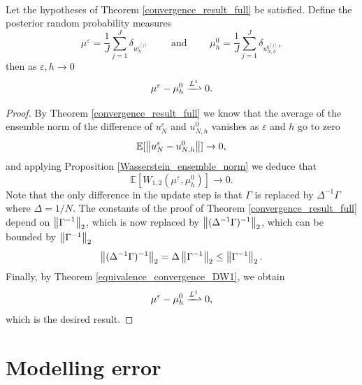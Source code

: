 \documentclass[10pt]{article}
\begin{document}
\begin{theorem}
\label{convergence_posterior_distributions}
\leavevmode \\
Let the hypotheses of Theorem \ref{convergence_result_full} be satisfied. Define the posterior random probability measures
\[ \mu^{\varepsilon} = \frac{1}{J} \sum_{j=1}^J \delta_{u_N^{\varepsilon^{(j)}}} \qquad \text{ and } \qquad \mu_h^{0} = \frac{1}{J} \sum_{j=1}^J \delta_{u_{N,h}^{0^{(j)}}}, \]
then as $\varepsilon, h \to 0$
\[ \mu^{\varepsilon} - \mu_h^0 \xrightharpoonup{L^1} 0. \]
\end{theorem}
\begin{proof}
By Theorem \ref{convergence_result_full} we know that the average of the ensemble norm of the difference of $u_N^{\varepsilon}$ and $u_{N,h}^0$ vanishes as $\varepsilon$ and $h$ go to zero
\[ \mathbb{E} [ \left\|u_N^{\varepsilon} - u_{N,h}^0\right\| ] \to 0, \]
and applying Proposition \ref{Wasserstein_ensemble_norm} we deduce that 
\[ \mathbb{E} [ W_{1,2}(\mu^{\varepsilon}, \mu_h^0) ] \to 0. \]
Note that the only difference in the update step is that $\Gamma$ is replaced by $\Delta^{-1} \Gamma$ where $\Delta = 1/N$. The constants of the proof of Theorem \ref{convergence_result_full} depend on $\left\|\Gamma^{-1}\right\|_2$, which is now replaced by $\left\|(\Delta^{-1} \Gamma)^{-1}\right\|_2$, which can be bounded by $\left\|\Gamma^{-1}\right\|_2$
\[ \left\|(\Delta^{-1} \Gamma)^{-1}\right\|_2 = \Delta \left\|\Gamma^{-1}\right\|_2 \le \left\|\Gamma^{-1}\right\|_2. \]
Finally, by Theorem \ref{equivalence_convergence_DW1}, we obtain
\[ \mu^{\varepsilon} - \mu_h^0 \xrightharpoonup{L^1} 0, \]
which is the desired result.
\end{proof}

\section{Modelling error}
\end{document}
